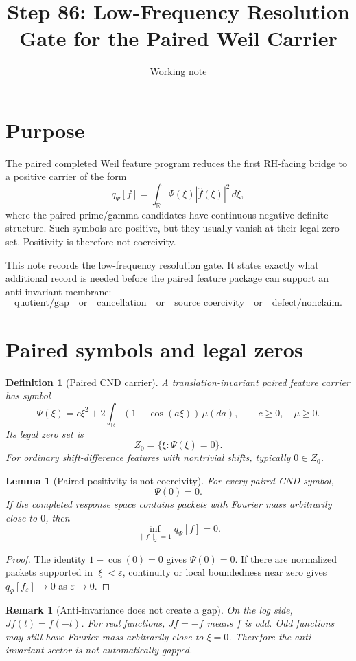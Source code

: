 \documentclass[11pt]{article}
\title{Step 86: Low-Frequency Resolution Gate for the Paired Weil Carrier}
\author{Working note}
\date{}
\newtheorem{lemma}{Lemma}
\newtheorem{definition}{Definition}
\newtheorem{remark}{Remark}
\begin{document}
\maketitle

\section{Purpose}
The paired completed Weil feature program reduces the first RH-facing bridge to a positive carrier of the form
\[
  q_\Psi[f]=\int_{\mathbb R}\Psi(\xi)|\widehat f(\xi)|^2\,d\xi,
\]
where the paired prime/gamma candidates have continuous-negative-definite structure. Such symbols are positive, but they usually vanish at their legal zero set. Positivity is therefore not coercivity.

This note records the low-frequency resolution gate. It states exactly what additional record is needed before the paired feature package can support an anti-invariant membrane:
\[
  \text{quotient/gap} \quad\text{or}\quad \text{cancellation} \quad\text{or}\quad \text{source coercivity} \quad\text{or}\quad \text{defect/nonclaim}.
\]

\section{Paired symbols and legal zeros}
\begin{definition}[Paired CND carrier]
A translation-invariant paired feature carrier has symbol
\[
  \Psi(\xi)=c\xi^2+2\int_{\mathbb R}(1-\cos(a\xi))\,\mu(da),
  \qquad c\ge0,
  \quad \mu\ge0.
\]
Its legal zero set is
\[
  Z_0=\{\xi:\Psi(\xi)=0\}.
\]
For ordinary shift-difference features with nontrivial shifts, typically $0\in Z_0$.
\end{definition}

\begin{lemma}[Paired positivity is not coercivity]
For every paired CND symbol,
\[
  \Psi(0)=0.
\]
If the completed response space contains packets with Fourier mass arbitrarily close to $0$, then
\[
  \inf_{\|f\|_2=1} q_\Psi[f]=0.
\]
\end{lemma}

\begin{proof}
The identity $1-\cos(0)=0$ gives $\Psi(0)=0$. If there are normalized packets supported in $|\xi|<\varepsilon$, continuity or local boundedness near zero gives $q_\Psi[f_\varepsilon]\to0$ as $\varepsilon\to0$.
\end{proof}

\begin{remark}[Anti-invariance does not create a gap]
On the log side, $Jf(t)=\overline{f(-t)}$. For real functions, $Jf=-f$ means $f$ is odd. Odd functions may still have Fourier mass arbitrarily close to $\xi=0$. Therefore the anti-invariant sector is not automatically gapped.
\end{remark}
\end{document}
